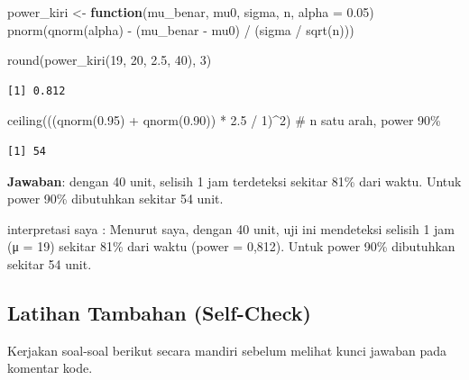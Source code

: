 \documentclass[
  indonesian,
  letterpaper,
]{book}
\newenvironment{Shaded}{\begin{snugshade}}{\end{snugshade}}
\newcommand{\AttributeTok}[1]{\textcolor[rgb]{0.40,0.45,0.13}{#1}}
\newcommand{\CommentTok}[1]{\textcolor[rgb]{0.37,0.37,0.37}{#1}}
\newcommand{\ControlFlowTok}[1]{\textcolor[rgb]{0.00,0.23,0.31}{\textbf{#1}}}
\newcommand{\DecValTok}[1]{\textcolor[rgb]{0.68,0.00,0.00}{#1}}
\newcommand{\FloatTok}[1]{\textcolor[rgb]{0.68,0.00,0.00}{#1}}
\newcommand{\FunctionTok}[1]{\textcolor[rgb]{0.28,0.35,0.67}{#1}}
\newcommand{\NormalTok}[1]{\textcolor[rgb]{0.00,0.23,0.31}{#1}}
\newcommand{\OtherTok}[1]{\textcolor[rgb]{0.00,0.23,0.31}{#1}}
\newcommand{\SpecialCharTok}[1]{\textcolor[rgb]{0.37,0.37,0.37}{#1}}
\begin{document}
\begin{Shaded}
\begin{Highlighting}[]
\NormalTok{power\_kiri }\OtherTok{\textless{}{-}} \ControlFlowTok{function}\NormalTok{(mu\_benar, mu0, sigma, n, }\AttributeTok{alpha =} \FloatTok{0.05}\NormalTok{)}
  \FunctionTok{pnorm}\NormalTok{(}\FunctionTok{qnorm}\NormalTok{(alpha) }\SpecialCharTok{{-}}\NormalTok{ (mu\_benar }\SpecialCharTok{{-}}\NormalTok{ mu0) }\SpecialCharTok{/}\NormalTok{ (sigma }\SpecialCharTok{/} \FunctionTok{sqrt}\NormalTok{(n)))}

\FunctionTok{round}\NormalTok{(}\FunctionTok{power\_kiri}\NormalTok{(}\DecValTok{19}\NormalTok{, }\DecValTok{20}\NormalTok{, }\FloatTok{2.5}\NormalTok{, }\DecValTok{40}\NormalTok{), }\DecValTok{3}\NormalTok{)}
\end{Highlighting}
\end{Shaded}

\begin{verbatim}
[1] 0.812
\end{verbatim}

\begin{Shaded}
\begin{Highlighting}[]
\FunctionTok{ceiling}\NormalTok{(((}\FunctionTok{qnorm}\NormalTok{(}\FloatTok{0.95}\NormalTok{) }\SpecialCharTok{+} \FunctionTok{qnorm}\NormalTok{(}\FloatTok{0.90}\NormalTok{)) }\SpecialCharTok{*} \FloatTok{2.5} \SpecialCharTok{/} \DecValTok{1}\NormalTok{)}\SpecialCharTok{\^{}}\DecValTok{2}\NormalTok{)   }\CommentTok{\# n satu arah, power 90\%}
\end{Highlighting}
\end{Shaded}

\begin{verbatim}
[1] 54
\end{verbatim}

\textbf{Jawaban}: dengan 40 unit, selisih 1 jam terdeteksi sekitar 81\%
dari waktu. Untuk power 90\% dibutuhkan sekitar 54 unit.

interpretasi saya : Menurut saya, dengan 40 unit, uji ini mendeteksi
selisih 1 jam (μ = 19) sekitar 81\% dari waktu (power = 0,812). Untuk
power 90\% dibutuhkan sekitar 54 unit.

\subsection{Latihan Tambahan
(Self-Check)}\label{latihan-tambahan-self-check-1}

Kerjakan soal-soal berikut secara mandiri sebelum melihat kunci jawaban
pada komentar kode.
\end{document}
